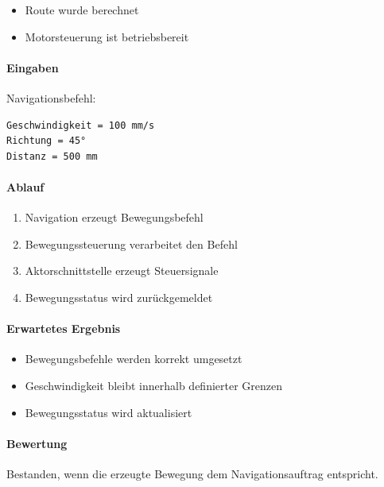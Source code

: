 \begin{itemize}
\tightlist
\item
  Route wurde berechnet
\item
  Motorsteuerung ist betriebsbereit
\end{itemize}

\paragraph{Eingaben}\label{eingaben-11}

Navigationsbefehl:

\begin{verbatim}
Geschwindigkeit = 100 mm/s
Richtung = 45°
Distanz = 500 mm
\end{verbatim}

\paragraph{Ablauf}\label{ablauf-11}

\begin{enumerate}
\def\labelenumi{\arabic{enumi}.}
\tightlist
\item
  Navigation erzeugt Bewegungsbefehl
\item
  Bewegungssteuerung verarbeitet den Befehl
\item
  Aktorschnittstelle erzeugt Steuersignale
\item
  Bewegungsstatus wird zurückgemeldet
\end{enumerate}

\paragraph{Erwartetes Ergebnis}\label{erwartetes-ergebnis-11}

\begin{itemize}
\tightlist
\item
  Bewegungsbefehle werden korrekt umgesetzt
\item
  Geschwindigkeit bleibt innerhalb definierter Grenzen
\item
  Bewegungsstatus wird aktualisiert
\end{itemize}

\paragraph{Bewertung}\label{bewertung-11}

Bestanden, wenn die erzeugte Bewegung dem Navigationsauftrag entspricht.

